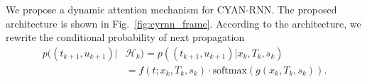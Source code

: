 We propose a dynamic attention mechanism for CYAN-RNN.
The proposed architecture is shown in Fig.~\ref{fig:cyrnn_frame}. 
According to the architecture, we rewrite the conditional probability of next
propagation
\begin{equation*}
\begin{aligned}
p((t_{k+1}, u_{k+1})|&\mathcal{H}_k)=p((t_{k+1}, u_{k+1})|x_k, T_k, s_k)\\
&=f(t; x_{k}, T_{k}, s_{k}) \cdot \text{softmax}(g(x_{k}, T_{k}, s_{k})).
\end{aligned}
\end{equation*}
